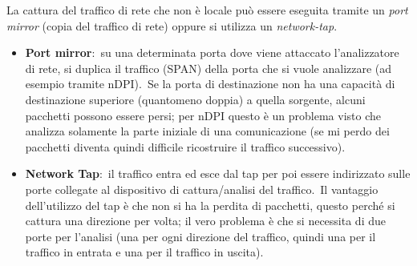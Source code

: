 La cattura del traffico di rete che non è locale può essere eseguita tramite un \textit{port mirror} (copia del traffico di rete) oppure si utilizza un \textit{network-tap}.\
\begin{itemize}
    \item\textbf{Port mirror}:\ su una determinata porta dove viene attaccato l'analizzatore di rete, si duplica il traffico (SPAN) della porta che si vuole analizzare (ad esempio tramite nDPI).\ Se la porta di destinazione non ha una capacità di destinazione superiore (quantomeno doppia) a quella sorgente, alcuni pacchetti possono essere persi; per nDPI questo è un problema visto che analizza solamente la parte iniziale di una comunicazione (se mi perdo dei pacchetti diventa quindi difficile ricostruire il traffico successivo).\
    \item\textbf{Network Tap}:\ il traffico entra ed esce dal tap per poi essere indirizzato sulle porte collegate al dispositivo di cattura/analisi del traffico.\ Il vantaggio dell'utilizzo del tap è che non si ha la perdita di pacchetti, questo perché si cattura una direzione per volta; il vero problema è che si necessita di due porte per l'analisi (una per ogni direzione del traffico, quindi una per il traffico in entrata e una per il traffico in uscita).
\end{itemize}
